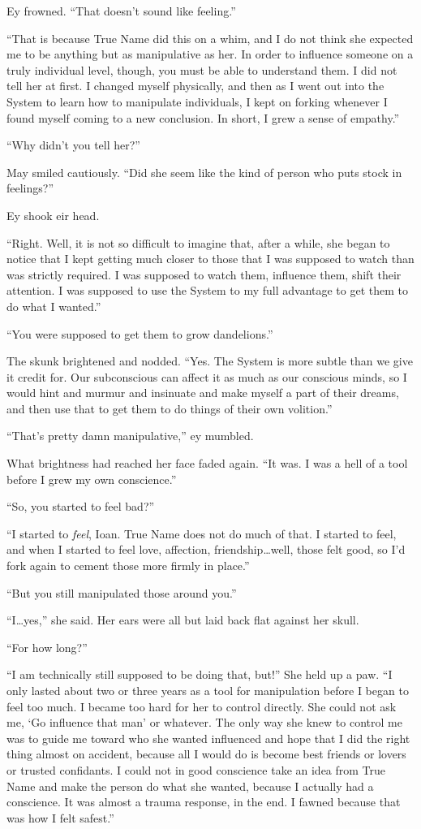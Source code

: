 Ey frowned. ``That doesn't sound like feeling.''

``That is because True Name did this on a whim, and I do not think she expected me to be anything but as manipulative as her. In order to influence someone on a truly individual level, though, you must be able to understand them. I did not tell her at first. I changed myself physically, and then as I went out into the System to learn how to manipulate individuals, I kept on forking whenever I found myself coming to a new conclusion. In short, I grew a sense of empathy.''

``Why didn't you tell her?''

May smiled cautiously. ``Did she seem like the kind of person who puts stock in feelings?''

Ey shook eir head.

``Right. Well, it is not so difficult to imagine that, after a while, she began to notice that I kept getting much closer to those that I was supposed to watch than was strictly required. I was supposed to watch them, influence them, shift their attention. I was supposed to use the System to my full advantage to get them to do what I wanted.''

``You were supposed to get them to grow dandelions.''

The skunk brightened and nodded. ``Yes. The System is more subtle than we give it credit for. Our subconscious can affect it as much as our conscious minds, so I would hint and murmur and insinuate and make myself a part of their dreams, and then use that to get them to do things of their own volition.''

``That's pretty damn manipulative,'' ey mumbled.

What brightness had reached her face faded again. ``It was. I was a hell of a tool before I grew my own conscience.''

``So, you started to feel bad?''

``I started to \emph{feel}, Ioan. True Name does not do much of that. I started to feel, and when I started to feel love, affection, friendship\ldots well, those felt good, so I'd fork again to cement those more firmly in place.''

``But you still manipulated those around you.''

``I\ldots yes,'' she said. Her ears were all but laid back flat against her skull.

``For how long?''

``I am technically still supposed to be doing that, but!'' She held up a paw. ``I only lasted about two or three years as a tool for manipulation before I began to feel too much. I became too hard for her to control directly. She could not ask me, `Go influence that man' or whatever. The only way she knew to control me was to guide me toward who she wanted influenced and hope that I did the right thing almost on accident, because all I would do is become best friends or lovers or trusted confidants. I could not in good conscience take an idea from True Name and make the person do what she wanted, because I actually had a conscience. It was almost a trauma response, in the end. I fawned because that was how I felt safest.''

